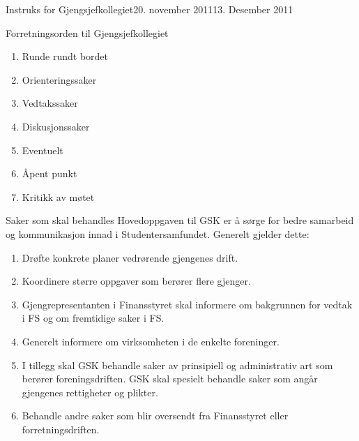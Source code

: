 \begin{instruks}{Instruks for Gjengsjefkollegiet}{20. november 2011}{13. Desember 2011}
\begin{instruksledd}{Forretningsorden til Gjengsjefkollegiet}
\begin{enumerate}
\begin{enumerate}
\begin{enumerate}
                            \item Runde rundt bordet
                            \item Orienteringssaker
                            \item Vedtakssaker
                            \item Diskusjonssaker
                            \item Eventuelt
                            \item Åpent punkt
                            \item Kritikk av møtet
                        \end{enumerate}
                \end{enumerate}
        \end{enumerate}
    \end{instruksledd}

    \begin{instruksledd}{Saker som skal behandles}
        Hovedoppgaven til GSK er å sørge for bedre samarbeid og kommunikasjon innad i
        Studentersamfundet. Generelt
        gjelder dette:
        \begin{enumerate}
            \item Drøfte konkrete planer vedrørende gjengenes drift.
            \item Koordinere større oppgaver som berører flere gjenger.
            \item Gjengrepresentanten i Finansstyret skal informere om bakgrunnen for
                vedtak i FS og om fremtidige saker i FS.
            \item Generelt informere om virksomheten i de enkelte foreninger.
            \item I tillegg skal GSK behandle saker av prinsipiell og administrativ art
                som berører foreningsdriften. GSK skal
                spesielt behandle saker som angår gjengenes rettigheter og plikter.
            \item Behandle andre saker som blir oversendt fra Finansstyret eller
                forretningsdriften.
        \end{enumerate}

    \end{instruksledd}
\end{instruks}







